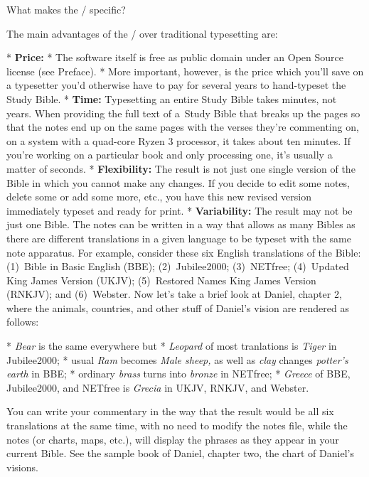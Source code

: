 \sec What makes the \OpBible/ specific?

The main advantages of the \OpBible/ over traditional typesetting are:

\begitems
* {\bf Price:} \begitems
  * The software itself is free as public domain under an Open Source license (see Preface). 
  * More important, however, is the price which   you'll save on a typesetter you'd otherwise have 
  to pay for several years to hand-typeset the Study Bible.
        \enditems
* {\bf Time:} Typesetting an entire Study Bible takes minutes, not years. 
 When providing the full text 
of a~Study Bible  that breaks up the pages so that the notes end up on the same pages with
  the verses they're commenting on, on a system with a quad-core Ryzen 3 processor, it takes about
  ten minutes. If you're working on a particular book and only processing one, it's usually a matter 
  of seconds.
* {\bf Flexibility:} The result is not just one single version of the Bible in which you cannot 
 make  any changes. If you decide to edit some notes, delete some or add some more, etc.,
  you have this new revised version immediately typeset and ready for print.
* {\bf Variability:} The result may not be
  just one Bible. The notes can be written in a way that allows as many Bibles as there are 
  different translations in a given language to be typeset with the same note apparatus. 
  For example, consider these six English translations of the Bible: 
(1)~Bible in Basic English (BBE); (2)~Jubilee2000; (3)~NETfree; (4)~Updated King James Version (UKJV); (5)~Restored Names King James Version (RNKJV); and (6)~Webster.
Now let's take a brief look at Daniel, chapter 2, where the animals, countries, and other stuff of Daniel's vision are rendered as follows: 

\begitems
* {\it Bear\/} is the same everywhere but
* {\it Leopard\/} of most tranlations is {\it Tiger\/} in Jubilee2000;
* usual {\it Ram\/} becomes {\it Male sheep,\/} as well as {\it clay\/} changes {\it potter's earth\/} in BBE;
* ordinary {\it brass\/} turns into {\it bronze\/} in NETfree;
* {\it Greece\/} of BBE, Jubilee2000, and NETfree is {\it Grecia\/} in UKJV, RNKJV, and Webster.
\enditems

You can write your commentary in the way that the result would be all six translations at the same time, with no need to modify the notes file, while the notes (or charts, maps, etc.), will display the phrases as they appear in your current Bible. See the sample book of Daniel, chapter two, the chart of Daniel's visions.

